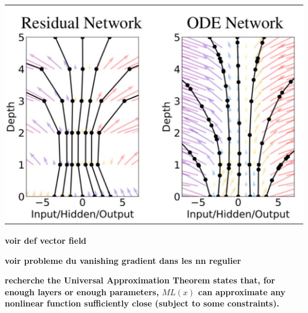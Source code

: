 \documentclass[10pt,a4paper]{article}
\theoremstyle{definition}
\theoremstyle{theorem}
\begin{document}
\begin{center}
\includegraphics[scale=0.7]{resnetvsodenet.png}
\end{center}

\textbf{voir def vector field}

\textbf{voir probleme du vanishing gradient dans les nn regulier}

\textbf{ recherche the Universal Approximation Theorem states that, for enough layers or enough parameters, $ML(x)$ can approximate any nonlinear function sufficiently close (subject to some constraints).}
\end{document}
